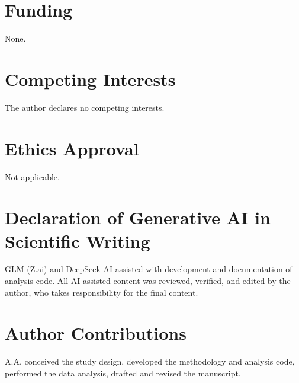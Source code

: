 \documentclass[11pt,a4paper]{article}
\theoremstyle{plain}
\theoremstyle{definition}
\theoremstyle{remark}
\begin{document}
\section*{Funding}
None.

\section*{Competing Interests}
The author declares no competing interests.

\section*{Ethics Approval}
Not applicable.

\section*{Declaration of Generative AI in Scientific Writing}
GLM (Z.ai) and DeepSeek AI assisted with development and
documentation of analysis code. All AI-assisted content was reviewed,
verified, and edited by the author, who takes responsibility for the
final content.

\section*{Author Contributions}
A.A. conceived the study design, developed the methodology and
analysis code, performed the data analysis, drafted and revised
the manuscript.


\end{document}
